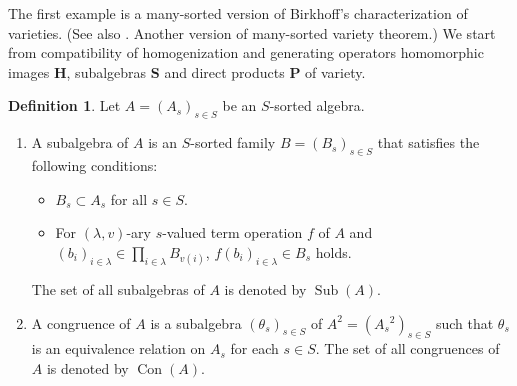 \documentclass[a4paper,10pt]{article}
\theoremstyle{definition}
\newtheorem{df}{Definition}[section]
\DeclareMathOperator{\Con}{Con}
\DeclareMathOperator{\Sub}{Sub}
\begin{document}
The first example is a many-sorted version of Birkhoff's characterization of varieties.
(See also \cite{ARV}. Another version of many-sorted variety theorem.)
We start from compatibility of homogenization and generating operators
homomorphic images $\mathbf{H}$, subalgebras $\mathbf{S}$ and direct products $\mathbf{P}$
of variety.
\begin{df}
Let $A=(A_s)_{s\in S}$ be an $S$-sorted algebra.
\begin{enumerate}
\item
A subalgebra of $A$ is an $S$-sorted family $B=(B_s)_{s\in S}$ that satisfies
the following conditions:
\begin{itemize}
\item
$B_s\subset A_s$ for all $s\in S$.
\item
For $(\lambda,v)$-ary $s$-valued term operation $f$ of $A$ and
$(b_i)_{i\in\lambda}\in \prod_{i\in\lambda}B_{v(i)}$,
$f(b_i)_{i\in \lambda}\in B_s$ holds.
\end{itemize}
The set of all subalgebras of $A$ is denoted by $\Sub(A)$.
\item
A congruence of $A$ is a subalgebra $(\theta_s)_{s\in S}$ of $A^2=(A_s{}^2)_{s\in S}$ such that
$\theta_s$ is an equivalence relation on $A_s$ for each $s\in S$.
The set of all congruences of $A$ is denoted by $\Con(A)$.
\end{enumerate}
\end{df}
\end{document}
